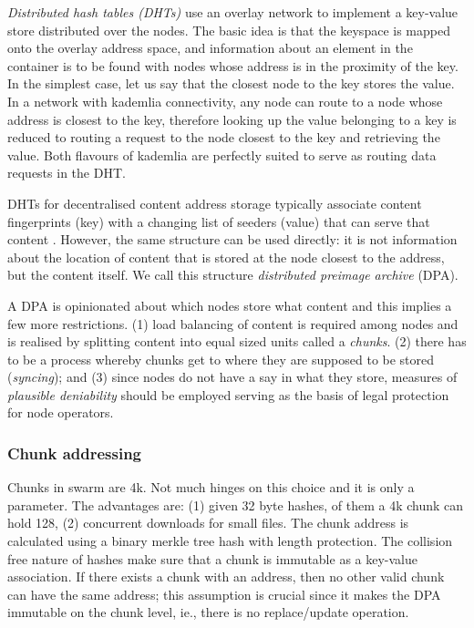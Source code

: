 \documentclass[a4paper,10pt,fullpage]{article}
\numberwithin{equation}{section}
\newcommand\gloss[1]{\emph{\gls{#1}}}
\theoremstyle{definition}
\begin{document}
\gloss{Distributed hash tables (DHTs)} use an overlay network to implement a key-value store distributed over the nodes. The basic idea is that the keyspace is mapped onto the overlay address space, and information about an element in the container is to be found with nodes whose address is in the proximity of the key. In the simplest case, let us say that the closest node to the key stores the value. In a network with kademlia connectivity, any node can route to a node whose address is closest to the key, therefore looking up the value belonging to a key is reduced to routing a request to the node closest to the key and retrieving the value.
Both flavours of kademlia are perfectly suited to serve as routing data requests in the DHT. 

DHTs for decentralised content address storage typically associate content fingerprints (key) with a changing list of seeders (value) that can serve that content \cite{ipfs2014, bittorrent}. However, the same structure can be used directly: it is not information about the location of content that is stored at the node closest to the address, but the content itself. We call this structure \gloss{distributed preimage archive} (DPA).

A DPA is opinionated about which nodes store what content and this implies a few more restrictions. (1) load balancing of content is required among nodes and is realised by splitting content into equal sized units called a \gloss{chunks}. (2) there has to be a process whereby chunks get to where they are supposed to be stored (\gloss{syncing}); and (3) since nodes do not have a say in what they store, measures of \gloss{plausible deniability} should be employed serving as the basis of legal protection for node operators. 

\subsubsection{Chunk addressing}

Chunks in swarm are 4k. Not much hinges on this choice and it is only a parameter.
The advantages are: (1) given 32 byte hashes, of them a 4k chunk can hold 128, (2) concurrent downloads for small files. 
The chunk address is calculated using a binary merkle tree hash with length protection. The collision free nature of hashes make sure that a chunk is immutable as  a key-value association. If there exists a chunk with an address, then no other valid chunk can have the same address; this assumption is crucial since it makes the DPA immutable on the chunk level, ie., there is no replace/update operation. 
\end{document}
